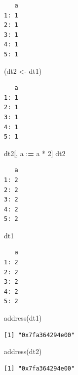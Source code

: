 \documentclass[
]{book}
\newenvironment{Shaded}{\begin{snugshade}}{\end{snugshade}}
\newcommand{\DecValTok}[1]{\textcolor[rgb]{0.00,0.00,0.81}{#1}}
\newcommand{\ErrorTok}[1]{\textcolor[rgb]{0.64,0.00,0.00}{\textbf{#1}}}
\newcommand{\FunctionTok}[1]{\textcolor[rgb]{0.00,0.00,0.00}{#1}}
\newcommand{\NormalTok}[1]{#1}
\newcommand{\OtherTok}[1]{\textcolor[rgb]{0.56,0.35,0.01}{#1}}
\newcommand{\SpecialCharTok}[1]{\textcolor[rgb]{0.00,0.00,0.00}{#1}}
\begin{document}
\begin{verbatim}
   a
1: 1
2: 1
3: 1
4: 1
5: 1
\end{verbatim}

\begin{Shaded}
\begin{Highlighting}[]
\NormalTok{(dt2 }\OtherTok{\textless{}{-}}\NormalTok{ dt1)}
\end{Highlighting}
\end{Shaded}

\begin{verbatim}
   a
1: 1
2: 1
3: 1
4: 1
5: 1
\end{verbatim}

\begin{Shaded}
\begin{Highlighting}[]
\NormalTok{dt2[, a }\SpecialCharTok{:}\ErrorTok{=}\NormalTok{ a }\SpecialCharTok{*} \DecValTok{2}\NormalTok{]}
\NormalTok{dt2}
\end{Highlighting}
\end{Shaded}

\begin{verbatim}
   a
1: 2
2: 2
3: 2
4: 2
5: 2
\end{verbatim}

\begin{Shaded}
\begin{Highlighting}[]
\NormalTok{dt1}
\end{Highlighting}
\end{Shaded}

\begin{verbatim}
   a
1: 2
2: 2
3: 2
4: 2
5: 2
\end{verbatim}

\begin{Shaded}
\begin{Highlighting}[]
\FunctionTok{address}\NormalTok{(dt1)}
\end{Highlighting}
\end{Shaded}

\begin{verbatim}
[1] "0x7fa364294e00"
\end{verbatim}

\begin{Shaded}
\begin{Highlighting}[]
\FunctionTok{address}\NormalTok{(dt2)}
\end{Highlighting}
\end{Shaded}

\begin{verbatim}
[1] "0x7fa364294e00"
\end{verbatim}
\end{document}
